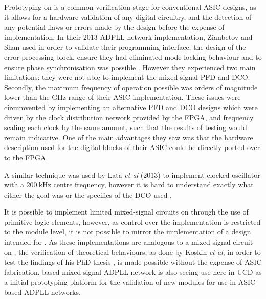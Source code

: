 Prototyping on  is a common verification stage for conventional \ac{ASIC} designs, as it allows for a hardware validation of any digital circuitry, and the detection of any potential flaws or errors made by the design before the expense of  implementation. In their 2013 \ac{ADPLL} network implementation, Zianbetov and Shan used  in order to validate their programming interface, the design of the error processing block, ensure they had eliminated mode locking behaviour and to ensure phase synchronisation was possible \cite{zianbetov2013phd,shan2014phd}. However they experienced two main limitations: they were not able to implement the mixed-signal \ac{PFD} and \ac{DCO}. Secondly, the maximum frequency of operation possible was orders of magnitude lower than the GHz range of their \ac{ASIC} implementation. These issues were circumvented by implementing an alternative \ac{PFD} and \ac{DCO} designs which were driven by the clock distribution network provided by the \ac{FPGA}, and frequency scaling each clock by the same amount, such that the results of testing would remain indicative. One of the main advantages they saw was that the hardware description used for the digital blocks of their \ac{ASIC} could be directly ported over to the \ac{FPGA}.

A similar technique was used by Lata \textit{et al} (2013) to implement  clocked oscillator with a $200~\si{\kilo\hertz}$ centre frequency, however it is hard to understand exactly what either the goal was or the specifics of the \ac{DCO} used \cite{lata2013adpll}.

It is possible to implement limited mixed-signal circuits on  through the use of primitive logic elements, however, as control over the implementation is restricted to the module level, it is not possible to mirror the implementation of a design intended for . As these implementations are analogous to a mixed-signal circuit on , the verification of theoretical behaviours, as done by Koskin \textit{et al}, in order to test the findings of his PhD thesis \cite{theboys2019}, is made possible without the expense of \ac{ASIC} fabrication.  based mixed-signal \ac{ADPLL} network is also seeing use here in \ac{UCD} as a initial prototyping platform for the validation of new modules for use in \ac{ASIC} based \ac{ADPLL} networks.

